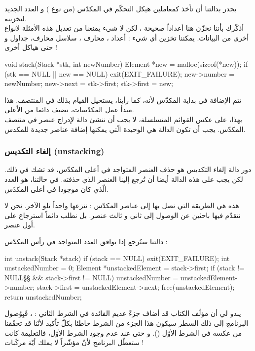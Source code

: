 يجدر بدالتنا
أن تأخذ كمعاملين هيكل التحكّم في المكدّس (من نوع
)
و العدد الجديد لتخزينه.\\
أذكّرك بأننا نخزّن هنا أعداداً صحيحة
،
لكن لا شيء يمنعنا من تعديل هذه الأمثلة لأنواع أخرى من البيانات. يمكننا تخزين أي شيء : أعداد
،
محارف
،
سلاسل محارف، جداول و حتى هياكل أخرى !

\begin{Csource}
void stack(Stack *stk, int newNumber)
{
	Element *new = malloc(sizeof(*new));
	if (stk == NULL || new == NULL)
	{
		exit(EXIT_FAILURE);
	}
	new->number = newNumber;
	new->next = stk->first;
	stk->first = new;
}
\end{Csource}

تتم الإضافة في بداية المكدّس لأنه، كما رأينا، يستحيل القيام بذلك في المنتصف. هذا مبدأ عمل المكدّسات، نضيف دائما من الأعلى. \\
بهذا، على عكس القوائم المتسلسلة، لا يجب أن ننشئ دالة لإدراج عنصر في منتصف المكدّس. يجب أن تكون الدالة
هي الوحيدة الّتي يمكنها إضافة عناصر جديدة للمكدس.

\subsubsection{إلغاء التكديس (\textenglish{unstacking})}

دور دالة إلغاء التكديس هو حذف العنصر المتواجد في أعلى المكدّس، قد تشك في ذلك. لكن يجب على هذه الدالة أيضا أن تُرجع إلينا العنصر الذي حذفته. في حالتنا، هو العدد الّذي كان موجودا في أعلى المكدّس.

هذه هي الطريقة التي نصل بها إلى عناصر المكدّس : ننزعها واحداً تلو الآخر. نحن لا نتقدّم فيها باحثين عن الوصول إلى ثاني و ثالث عنصر. بل نطلب دائماً استرجاع على أول عنصر.

دالتنا
ستُرجع إذا
يوافق العدد المتواجد في رأس المكدّس  :

\begin{Csource}
int unstack(Stack *stack)
{
	if (stack == NULL)
	{
		exit(EXIT_FAILURE);
	}
	int unstackedNumber = 0;
	Element *unstackedElement = stack->first;
	if (stack != NULL§\footnotemark§ && stack->first != NULL)
	{
		unstackedNumber = unstackedElement->number;
		stack->first = unstackedElement->next;
		free(unstackedElement);
	}
	return unstackedNumber;
}
\end{Csource}

\begin{tcolorbox}[title={\footnotemark[1]ملاحظة مُرَاجِع الكتاب}, colback=orange!20, colframe=orange!70, fontupper=\small, coltitle=white, fonttitle=\normalsize, attach title]
يبدو لي أن مؤلّف الكتاب قد أضاف جزءً عديم الفائدة في الشرط الثاني :
،
فَبِوُصول البرنامج إلى ذلك السطر سيكون هذا الجزء من الشرط خاطئا بكلّ تأكيد لأنّنا قد تحقّقنا من عكسه في الشرط الأوّل 
().
و حتى عند عدم وجود الشرط الأوّل، فالتعليمة
كانت ستعطّل البرنامج لأنّ مؤشّراً
لا يملك أيّة مركّبات !
\end{tcolorbox}

